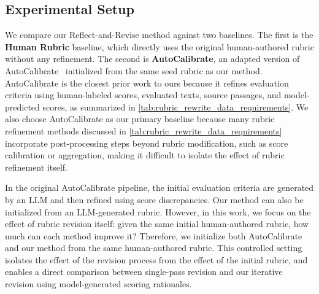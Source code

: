 \documentclass[11pt]{article}
\begin{document}
\subsection{Experimental Setup}
We compare our Reflect-and-Revise method against two baselines. The first is the \textbf{Human Rubric} baseline, which directly uses the original human-authored rubric without any refinement. The second is \textbf{AutoCalibrate}, an adapted version of AutoCalibrate~\citep{liu-etal-2024-calibrating} initialized from the same seed rubric as our method. AutoCalibrate is the closest prior work to ours because it refines evaluation criteria using human-labeled scores, evaluated texts, source passages, and model-predicted scores, as summarized in \autoref{tab:rubric_rewrite_data_requirements}. We also choose AutoCalibrate as our primary baseline because many rubric refinement methods discussed in \autoref{tab:rubric_rewrite_data_requirements} incorporate post-processing steps beyond rubric modification, such as score calibration or aggregation, making it difficult to isolate the effect of rubric refinement itself.

In the original AutoCalibrate pipeline, the initial evaluation criteria are generated by an LLM and then refined using score discrepancies. Our method can also be initialized from an LLM-generated rubric. However, in this work, we focus on the effect of rubric revision itself: given the same initial human-authored rubric, how much can each method improve it? Therefore, we initialize both AutoCalibrate and our method from the same human-authored rubric. This controlled setting isolates the effect of the revision process from the effect of the initial rubric, and enables a direct comparison between single-pass revision and our iterative revision using model-generated scoring rationales.
\end{document}
